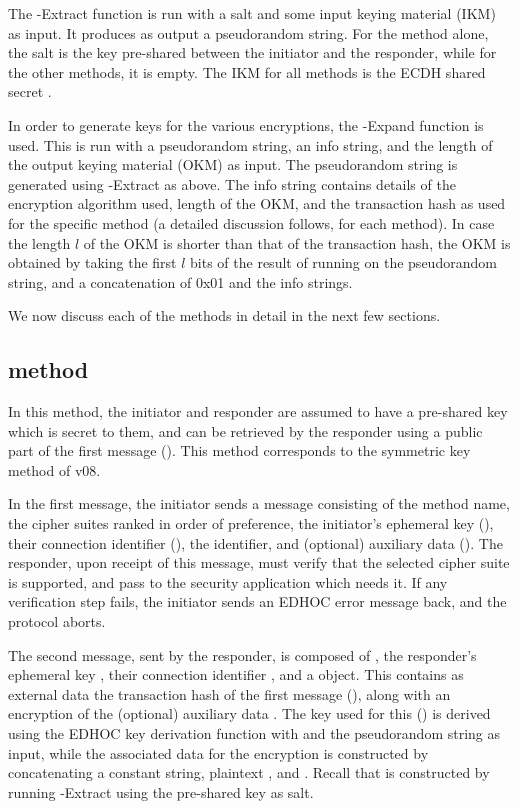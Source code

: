 The \mHkdf-Extract function is run with a salt and some input keying material (IKM) as input. It produces as output a pseudorandom string. For the \mPskPsk method alone, the salt is the key pre-shared between the initiator and the responder, while for the other methods, it is empty. The IKM for all \mEdhoc methods is the ECDH shared secret \mGxy.

In order to generate keys for the various encryptions, the \mHkdf-Expand function is used. This is run with a pseudorandom string, an info string, and the length of the output keying material (OKM) as input. The pseudorandom string is generated using \mHkdf-Extract as above. The info string contains details of the \mAead encryption algorithm used, length of the OKM, and the transaction hash as used for the specific method (a detailed discussion follows, for each method). In case the length $l$ of the OKM is shorter than that of the transaction hash, the OKM is obtained by taking the first $l$ bits of the result of running \mHmac on the pseudorandom string, and a concatenation of 0x01 and the info strings.

We now discuss each of the \mEdhoc methods in detail in the next few sections.

\subsection{\mPskPsk method}
In this method, the initiator and responder are assumed to have a pre-shared key which is secret to them, and can be retrieved by the responder using a public part of the first message (\mIDPSK). This method corresponds to the symmetric key method of \mEdhoc v08. 

In the first message, the initiator sends a message consisting of the method name, the cipher suites ranked in order of preference, the initiator's ephemeral key (\mGx), their connection identifier (\mCi), the \mIDPSK identifier, and (optional) auxiliary data (\mADone). The responder, upon receipt of this message, must verify that the selected cipher suite is supported,  and pass \mADone to the security application which needs it. If any verification step fails, the initiator sends an EDHOC error message back, and the protocol aborts.

The second message, sent by the responder, is composed of \mCi, the responder's ephemeral key \mGy, their connection identifier \mCr, and a \mCose object. This contains as external data the transaction hash of the first message (\mTHtwo), along with an \mAead encryption of the (optional) auxiliary data \mADtwo. The key used for this (\mKtwo) is derived using the EDHOC key derivation function with \mTHtwo and the pseudorandom string \mPRKtwo as input, while the associated data for the \mAead encryption is constructed by concatenating a constant string, plaintext \mhplain, and \mTHtwo. Recall that \mPRKtwo is constructed by running \mHkdf-Extract using the pre-shared key as salt. 

